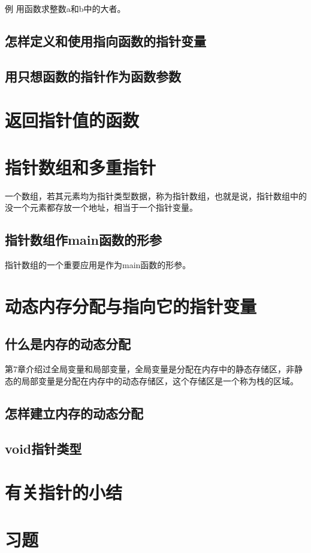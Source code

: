 例 用函数求整数a和b中的大者。
\subsection{怎样定义和使用指向函数的指针变量}
\subsection{用只想函数的指针作为函数参数}
\section{返回指针值的函数}
\section{指针数组和多重指针}
一个数组，若其元素均为指针类型数据，称为指针数组，也就是说，指针数组中的没一个元素都存放一个地址，相当于一个指针变量。
\subsection{指针数组作main函数的形参}
指针数组的一个重要应用是作为main函数的形参。
\section{动态内存分配与指向它的指针变量}
\subsection{什么是内存的动态分配}
第7章介绍过全局变量和局部变量，全局变量是分配在内存中的静态存储区，非静态的局部变量是分配在内存中的动态存储区，这个存储区是一个称为栈的区域。
\subsection{怎样建立内存的动态分配}
\subsection{void指针类型}
\section{有关指针的小结}
\section{习题}
